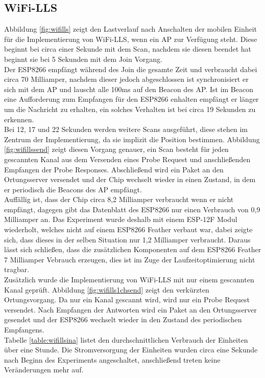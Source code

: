\subsection{WiFi-LLS}
\label{ch:realworld:sec:wifills}
Abbildung \ref{fig:wifills} zeigt den Lastverlauf nach Anschalten der mobilen Einheit für die Implementierung von WiFi-LLS, wenn ein AP zur Verfügung steht. 
Diese beginnt bei circa einer Sekunde mit dem Scan, nachdem sie diesen beendet hat beginnt sie bei 5 Sekunden mit dem Join Vorgang.\\
Der ESP8266 empfängt während des Join die gesamte Zeit und verbraucht dabei circa 70 Milliamper, nachdem dieser jedoch abgeschlossen ist synchronisiert er sich mit dem AP und lauscht alle 100ms auf den Beacon des AP.
Ist im Beacon eine Aufforderung zum Empfangen für den ESP8266 enhalten empfängt er länger um die Nachricht zu erhalten, ein solches Verhalten ist bei circa 19 Sekunden zu erkennen.\\
Bei 12, 17 und 22 Sekunden werden weitere Scans ausgeführt, diese stehen im Zentrum der Implementierung, da sie implizit die Position bestimmen.
Abbildung \ref{fig:wifillssend} zeigt diesen Vorgang genauer, ein Scan besteht für jeden gescannten Kanal aus dem Versenden eines Probe Request und anschließenden Empfangen der Probe Responses. 
Abschließend wird ein Paket an den Ortungsserver versendet und der Chip wechselt wieder in einen Zustand, in dem er periodisch die Beacons des AP empfängt.\\
Auffällig ist, dass der Chip circa 8,2 Milliamper verbraucht wenn er nicht empfängt, dagegen gibt das Datenblatt des ESP8266 nur einen Verbrauch von 0,9 Milliamper an.
Das Experiment wurde deshalb mit einem ESP-12F Modul wiederholt, welches nicht auf einem ESP8266 Feather verbaut war, dabei zeigte sich, dass dieses in der selben Situation nur 1,2 Milliamper verbraucht.
Daraus lässt sich schließen, dass die zusätzlichen Komponenten auf dem ESP8266 Feather 7 Milliamper Vebrauch erzeugen, dies ist im Zuge der Laufzeitoptimierung nicht tragbar.\\
Zusätzlich wurde die Implementierung von WiFi-LLS mit nur einem gescannten Kanal geprüft.
Abbildung \ref{fig:wifills1chsend} zeigt den verkürzten Ortungsvorgang.
Da nur ein Kanal gescannt wird, wird nur ein Probe Request versendet.
Nach Empfangen der Antworten wird ein Paket an den Ortungsserver gesendet und der ESP8266 wechselt wieder in den Zustand des periodischen Empfangens.\\
Tabelle \ref{table:wifillsina} listet den durchschnittlichen Verbrauch der Einheiten über eine Stunde.
Die Stromversorgung der Einheiten wurden circa eine Sekunde nach Beginn des Experiments angeschaltet, anschließend treten keine Veränderungen mehr auf.


